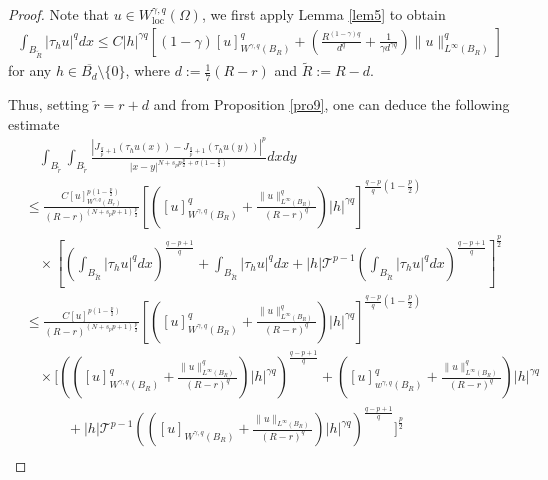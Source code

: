 \documentclass[reqno,10pt]{amsart}
\numberwithin{equation}{section}
\begin{document}
\begin{proof}
	Note that $u\in W^{\gamma,q}_{\mathrm{loc}}(\Omega)$, we first apply Lemma \ref{lem5} to obtain 
	\begin{align}\label{11.0}
		\int_{B_{\widetilde{R}}}\left|\tau_h u\right|^q d x \leq C|h|^{\gamma q}\left[(1-\gamma)[u]_{W^{\gamma, q}\left(B_R\right)}^q+\left(\frac{R^{(1-\gamma) q}}{d^q}+\frac{1}{\gamma d^{\gamma q}}\right)\|u\|_{L^{\infty}(B_R)}^q\right]
	\end{align}
	for any $h \in \overline{{B}_d} \setminus\{0\}$, where $d:=\frac{1}{7}(R-r)$ and $\widetilde{R}:=R-d$.\par
	Thus, setting $\tilde{r}=r+d$ and from Proposition \ref{pro9}, one can deduce the following estimate 
	\begin{align}
		\label{11.1}
		&\quad\int_{B_{\tilde{r}}} \int_{B_{\tilde{r}}} \frac{\left| J_{\frac{q}{p}+1}\left(\tau_h u(x)\right)-J_{\frac{q}{p}+1}\left(\tau_h u(y)\right)\right|^p}{|x-y|^{N+s_p p  \frac{p}{2}+\sigma\left(1-\frac{p}{2}\right)}} d x d y \nonumber \\
		&\leq \frac{C[u]_{W^{\gamma,q}\left(B_r\right)}^{p\left(1-\frac{p}{2}\right)}}{(R-r)^{(N+s_p p+1)\frac{p}{2}}}\left[\left([u]_{W^{\gamma,q}\left(B_R\right)}^q+\frac{\| u \|_{L^{\infty}\left(B_R\right)}^q}{(R-r)^q}\right)|h|^{\gamma q}\right]^{\frac{q-p}{q}\left(1-\frac{p}{2}\right)} \nonumber\\
		&\quad \times\left[\left(\int_{B_{\widetilde{R}}}\left|\tau_h u\right|^q d x\right)^{\frac{q-p+1}{q}}+\int_{B_{\widetilde{R}}}\left|\tau_h u\right|^q d x+|h| \mathcal{T}^{p-1}\left(\int_{B_{\widetilde{R}}}\left|\tau_h u\right|^q d x\right)^{\frac{q-p+1}{q}}\right]^{\frac{p}{2}}\nonumber\\
		&\leq \frac{C[u]^{p\left(1-\frac{p}{2}\right)}}{(R-r)^{(N+s_p p+1)\frac{p}{2}}}\left[\left([u]_{W^{\gamma, q}\left(B_R\right)}^q+\frac{\|u\|_{L^\infty\left(B_R\right)}^q}{(R-r)^q}\right)|h|^{\gamma q}\right]^{\frac{q-p}{q}\left(1-\frac{p}{2}\right)}\nonumber \\
		& \quad\times\Bigg[\left(\left([u]_{W^{\gamma, q}\left(B_R\right)}^q+\frac{\|u\|_{L^{\infty}\left(B_R\right)}^q}{(R-r)^q}\right)|h|^{\gamma q}\right)^{\frac{q-p+1}{q}}+\left([u]_{w^{\gamma ,q}\left(B_R\right)}^q+\frac{\|u\|_{L^\infty\left(B_R\right)}^q}{(R-r)^q}\right)|h|^{\gamma q}\nonumber\\
		&\quad\qquad+|h| \mathcal{T}^{p-1}\left(\left([u]_{W^{\gamma,q}\left(B_R\right)}+\frac{\|u\| _{L^\infty\left(B_R\right)}}{(R-r)^q}\right)|h|^{\gamma q}\right)^{\frac{q-p+1}{q}}\Bigg]^{\frac{p}{2}}\nonumber\\

\end{align}
\end{proof}
\end{document}
